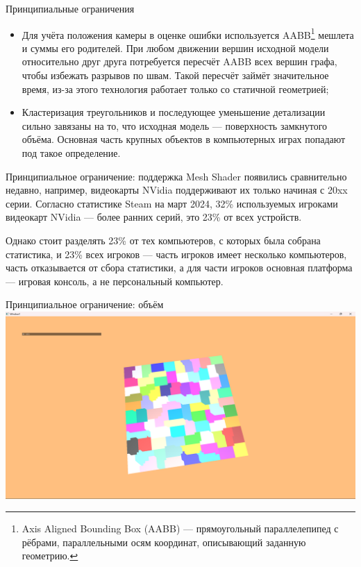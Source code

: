 \documentclass{beamer}
\begin{document}
    \begin{frame}{Принципиальные ограничения}
        \begin{itemize}
            \item
            Для учёта положения камеры в оценке ошибки
            используется AABB\footnote{
                Axis Aligned Bounding Box (AABB) ---
                прямоугольный параллелепипед
                с рёбрами, параллельными осям координат,
                описывающий заданную геометрию.
            } мешлета и суммы его родителей.
            При любом движении вершин исходной модели
            относительно друг друга потребуется
            пересчёт AABB всех вершин графа,
            чтобы избежать разрывов по швам.
            Такой пересчёт займёт значительное время,
            из-за этого технология работает только со
            статичной геометрией;

            \item
            Кластеризация треугольников и последующее уменьшение
            детализации сильно завязаны на то,
            что исходная модель --- поверхность замкнутого объёма.
            Основная часть крупных объектов в компьютерных играх
            попадают под такое определение.
        \end{itemize}
    \end{frame}

    \begin{frame}{Принципиальное ограничение: поддержка}
        Mesh Shader появились сравнительно недавно,
        например, видеокарты NVidia поддерживают
        их только начиная с 20xx серии.
        Согласно статистике Steam на март 2024,
        32\% используемых игроками видеокарт NVidia
        --- более ранних серий,
        это 23\% от всех устройств.

        \bigskip

        Однако стоит разделять
        23\% от тех компьютеров,
        с которых была собрана статистика,
        и 23\% всех игроков ---
        часть игроков имеет несколько компьютеров,
        часть отказывается от сбора статистики,
        а для части игроков основная платформа
        --- игровая консоль, а не персональный компьютер.
    \end{frame}

    \begin{frame}{Принципиальное ограничение: объём}
        \includegraphics[width=\textwidth]{plane0.png}
    \end{frame}
\end{document}
